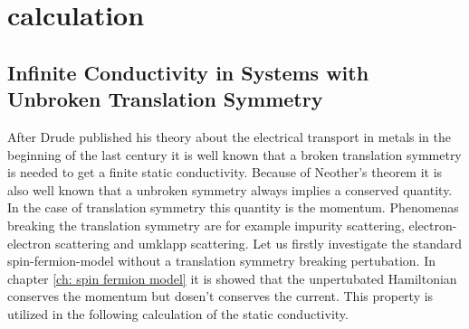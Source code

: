 %
%
\chapter{calculation}
\label{app:calculation}
%
%
%
%
\section{Infinite Conductivity in Systems with Unbroken Translation Symmetry}
\label{sec: Infinite conductivity in a system with unbroken translation symmetry}
%
%
After Drude published his theory about the electrical transport in metals \cite{Drude} in the beginning of the last century it is well known that a broken translation symmetry is needed to get a finite static conductivity.
Because of Neother's theorem \cite{Noether1} it is also well known that a unbroken symmetry always implies a conserved quantity.
In the case of translation symmetry this quantity is the momentum.
Phenomenas breaking the translation symmetry are for example impurity scattering, electron-electron scattering and umklapp scattering.
Let us firstly investigate the standard spin-fermion-model without a translation symmetry breaking pertubation.
In chapter \ref{ch: spin fermion model} it is showed that the unpertubated Hamiltonian conserves the momentum but dosen't conserves the current.
This property is utilized in the following calculation of the static conductivity.

